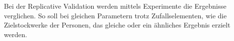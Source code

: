 \documentclass[envcountsame, envcountchap, deutsch]{i-studis}
\begin{document}
Bei der Replicative Validation werden mittels Experimente die Ergebnisse
verglichen. So soll bei gleichen Parametern trotz Zufallselementen, wie
die Zielstockwerke der Personen, das gleiche oder ein ähnliches Ergebnis
erzielt werden.




\end{document}
